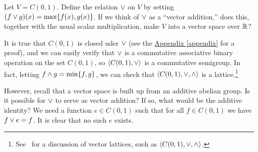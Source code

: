 \begin{problem}[Golan 60]\hskip-2mm\protect\footnotemark
\label{prob:2}
\renewcommand\boxplus{\ensuremath{\join}}
Let $V = C(0,1)$. Define the relation $\boxplus$ on $V$ by setting 
$(f \boxplus g)(x)= \max \{f(x), g(x)\}$.  
If we think of $\boxplus$ as a ``vector addition,'' does this, together with the
usual scalar multiplication, make $V$ into a vector space over $\mathbb{R}$?

\end{problem}
\smallskip
\begin{solution}
It is true that $C(0,1)$ is closed uder $\vee$ (see the
\hyperref[appendix]{Appendix \ref*{appendix}} for a
proof), and we can easily verify that $\vee$ is a commutative associative
binary operation on the set $C(0,1)$, so $\langle C(0,1), \vee\rangle$ is a 
commutative semigroup.  In fact, letting  
$f \wedge g = \min\{f, g\}$, we can check that $\langle C(0,1), \vee,
\wedge\rangle$  is a lattice.\footnote{See~\cite[Sec.~30]{Aliprantis:1998} for a
  discussion of vector lattices, such as $\langle C(0,1), \vee, \wedge\rangle$.}

However, recall that a vector space is built up from an additive abelian group.
Is it possible for $\vee$ to serve as vector addition?  If so, what would be
the additive identity?  We need a function $e \in C(0,1)$ such that for all $f
\in C(0,1)$ we have $f \vee e = f$.  It is clear that no such $e$ exists.

\end{solution}
\probskip



